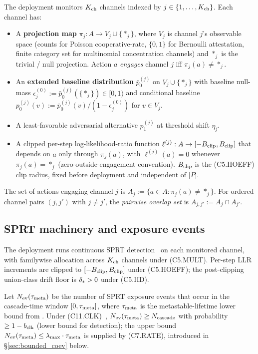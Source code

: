 The deployment monitors $K_{\mathrm{ch}}$ channels indexed by $j \in \{1,
\ldots, K_{\mathrm{ch}}\}$. Each channel has:
\begin{itemize}
\item A \textbf{projection map} $\pi_j: A \to V_j \cup \{*_j\}$,
  where $V_j$ is channel $j$'s observable space (counts for
  Poisson cooperative-rate, $\{0,1\}$ for Bernoulli attestation,
  finite category set for multinomial concentration channels)
  and $*_j$ is the trivial / null projection. Action $a$
  \emph{engages} channel $j$ iff $\pi_j(a) \neq *_j$.
\item An \textbf{extended baseline distribution}
  $\bar{p}_0^{(j)}$ on $V_j \cup \{*_j\}$ with baseline null-mass
  $\epsilon_j^{(0)} := \bar{p}_0^{(j)}(\{*_j\}) \in [0, 1)$ and
  conditional baseline $p_0^{(j)}(v) := \bar{p}_0^{(j)}(v) / (1 -
  \epsilon_j^{(0)})$ for $v \in V_j$.
\item A least-favorable adversarial alternative $p_1^{(j)}$ at
  threshold shift $\eta_j$.
\item A clipped per-step log-likelihood-ratio function
  $\ell^{(j)}: A \to [-B_{\mathrm{clip}}, B_{\mathrm{clip}}]$ that depends on $a$ only
  through $\pi_j(a)$, with $\ell^{(j)}(a) = 0$ whenever $\pi_j(a)
  = *_j$ (zero-outside-engagement convention). $B_{\mathrm{clip}}$ is the
  (C5.HOEFF) clip radius, fixed before deployment and independent
  of $|P|$.
\end{itemize}

The set of actions engaging channel $j$ is $A_j := \{a \in A :
\pi_j(a) \neq *_j\}$. For ordered channel pairs $(j, j')$ with
$j \neq j'$, the \emph{pairwise overlap set} is $A_{j, j'} := A_j
\cap A_{j'}$.

\subsection{SPRT machinery and exposure events}

The deployment runs continuous SPRT
detection~\citep{lasser2026exo,wald1947sequential} on each
monitored channel, with familywise allocation across $K_{\mathrm{ch}}$
channels under (C5.MULT). Per-step LLR increments are clipped to
$[-B_{\mathrm{clip}}, B_{\mathrm{clip}}]$ under (C5.HOEFF); the post-clipping
union-class drift floor is $\delta_{*} > 0$ under (C5.IID).

Let $N_{\mathrm{ev}}(\tau_{\mathrm{meta}})$ be the number of SPRT exposure events that
occur in the cascade-time window $[0, \tau_{\mathrm{meta}}]$, where $\tau_{\mathrm{meta}}$
is the metastable-lifetime lower bound from
\citep[Phase Redundancy]{lasser2026phase}. Under
(C11.CLK)~\citep[Deployment Safety]{lasser2026paper10}, $N_{\mathrm{ev}}(\tau_{\mathrm{meta}}) \geq
N_{\mathrm{cascade}}$ with probability $\geq 1 - b_{\mathrm{clk}}$ (lower
bound for detection); the upper bound $N_{\mathrm{ev}}(\tau_{\mathrm{meta}}) \leq
\lambda_{\max} \cdot \tau_{\mathrm{meta}}$ is supplied by (C7.RATE), introduced in
\S\ref{sec:bounded_coev} below.

